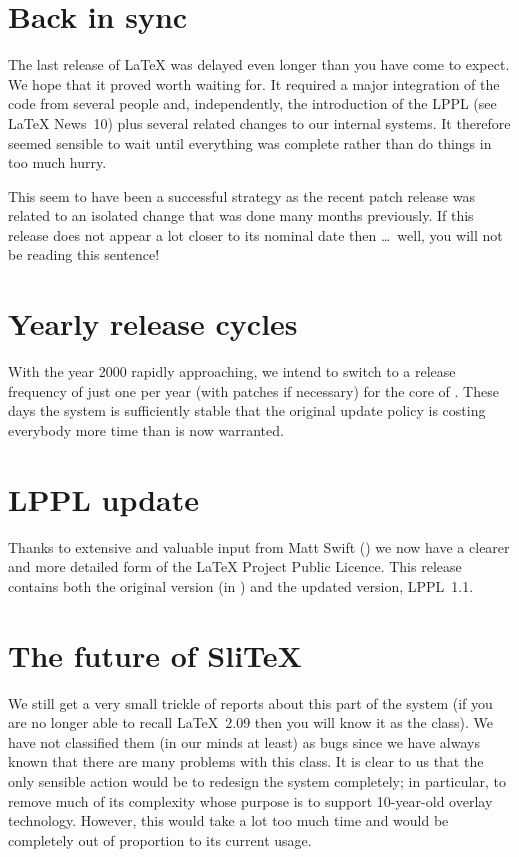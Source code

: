 \documentclass{ltnews}
\begin{document}
\maketitle

\section{Back in sync}

The last release of \LaTeX{} was delayed even longer than you have
come to expect.  We hope that it proved worth waiting for.  It
required a major integration of the code from several people and,
independently, the introduction of the LPPL (see \LaTeX{} News~10) plus
several related changes to our internal systems.  It therefore seemed
sensible to wait until everything was complete rather than do things
in too much hurry.

This seem to have been a successful strategy as
the recent patch release was related to an isolated change that was
done many months previously.  If this release does not appear a lot
closer to its nominal date then \ldots~well, you will not be reading
this sentence!

\section{Yearly release cycles}

With the year 2000 rapidly approaching, we intend to switch to a
release frequency of just one per year (with patches if necessary) for
the core of \LaTeXe{}. These days the system is sufficiently stable
that the original update policy is costing everybody more time than is
now warranted.

\section{LPPL update}

Thanks to extensive and valuable input from Matt Swift
() we now have a clearer and more detailed
form of the \LaTeX{} Project Public Licence.  This release contains
both the original version (in ) and the updated
version, LPPL~1.1.

\section{The future of Sli\TeX{}}

We still get a very small trickle of reports about this part of the
system (if you are no longer able to recall \LaTeX~2.09 then you will
know it as the  class).  We have not classified them (in
our minds at least) as bugs since we have always known that there are
many problems with this class.  It is clear to us that the only
sensible action would be to redesign the system completely; in
particular, to remove much of its complexity whose purpose is to
support 10-year-old overlay technology.  However, this would take a
lot too much time and would be completely out of proportion to its
current usage.
\end{document}
